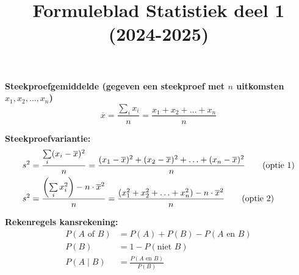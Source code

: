 \documentclass[11pt,a4paper,dutch]{article} %
\title{Formuleblad Statistiek deel 1 (2024-2025)}
\author{}
\date{}
\begin{document}
\maketitle
\vspace{-1cm}
\textbf{Steekproefgemiddelde (gegeven een steekproef met $n$ uitkomsten $x_1, x_2, \ldots, x_n$)}
\[
    \overline{x} = \frac{\sum\limits_{i} x_i}{n} = \frac{x_1 + x_2 + \ldots + x_n}{n}
\]

\textbf{Steekproefvariantie:}
\begin{align}
    s^2 &= \frac{\sum\limits_{i} (x_i-\overline{x})^2}{n} = \frac{(x_1-\overline{x})^2 + (x_2-\overline{x})^2 + \ldots + (x_n - \overline{x})^2}{n} \hfill \tag{optie 1} \\%
    s^2 &= \frac{\left(\sum\limits_{i} x_i^2\right) - n \cdot \overline{x}^2}{n} = \frac{(x_1^2+x_2^2+\ldots+x_n^2) - n \cdot \overline{x}^2}{n} \hfill \tag{optie 2}
\end{align}

\textbf{Rekenregels kansrekening:}
\begin{align*}
    P(A \text{ of } B)      &= P(A) + P(B) - P(A \text{ en } B) \tag{optelregel}\\
    P(B)                    &= 1 - P(\text{niet } B) \tag{complementregel}\\
    P(A \mid B)         &= \frac{P(A \text{ en } B)}{P(B)} \tag{conditionele kansen}
\end{align*}
\end{document}
